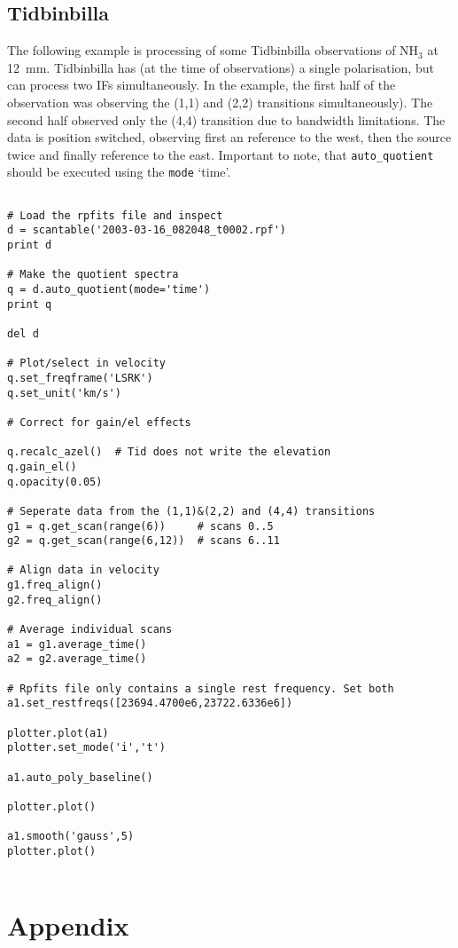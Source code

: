 \documentclass[11pt]{article}
\newcommand{\cmd}[1]{{\tt #1}}
\begin{document}
\subsection{Tidbinbilla}

The following example is processing of some
Tidbinbilla observations of NH$_3$ at 12~mm. Tidbinbilla has (at the
time of observations) a single polarisation, but can process two IFs
simultaneously. In the example, the first half of the observation was
observing the (1,1) and (2,2) transitions simultaneously). The second
half observed only the (4,4) transition due to bandwidth
limitations. The data is position switched, observing first an
reference to the west, then the source twice and finally reference to
the east. Important to note, that \cmd{auto\_quotient} should be executed 
using the \cmd{mode} `time'.

\begin{verbatim}

# Load the rpfits file and inspect
d = scantable('2003-03-16_082048_t0002.rpf')
print d

# Make the quotient spectra
q = d.auto_quotient(mode='time')
print q

del d

# Plot/select in velocity
q.set_freqframe('LSRK')
q.set_unit('km/s')

# Correct for gain/el effects

q.recalc_azel()  # Tid does not write the elevation
q.gain_el()
q.opacity(0.05)

# Seperate data from the (1,1)&(2,2) and (4,4) transitions
g1 = q.get_scan(range(6))     # scans 0..5
g2 = q.get_scan(range(6,12))  # scans 6..11

# Align data in velocity
g1.freq_align()
g2.freq_align()

# Average individual scans
a1 = g1.average_time()
a2 = g2.average_time()

# Rpfits file only contains a single rest frequency. Set both
a1.set_restfreqs([23694.4700e6,23722.6336e6])

plotter.plot(a1)
plotter.set_mode('i','t')

a1.auto_poly_baseline()

plotter.plot()

a1.smooth('gauss',5)
plotter.plot()


\end{verbatim}

\newpage

\section{Appendix}
\end{document}
